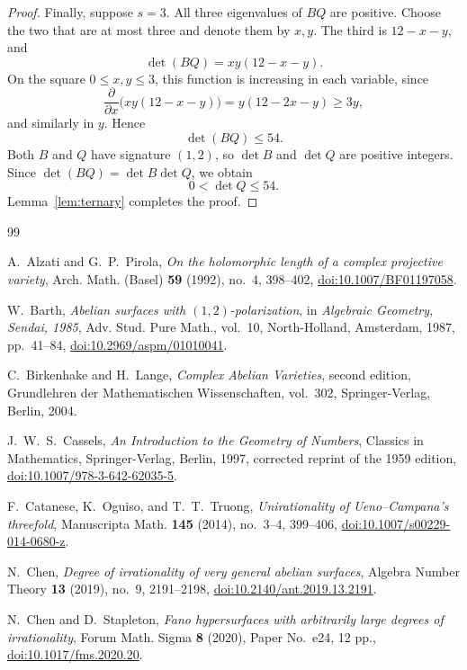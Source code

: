 \documentclass[12pt]{amsart}
\numberwithin{equation}{section}
\theoremstyle{definition}
\theoremstyle{remark}
\begin{document}
\begin{proof}
Finally, suppose $s=3$.  All three eigenvalues of $BQ$ are positive.
Choose the two that are at most three and denote them by $x,y$.  The
third is $12-x-y$, and
\[
                         \det(BQ)=xy(12-x-y).
\]
On the square $0\leq x,y\leq3$, this function is increasing in each
variable, since
\[
 \frac{\partial}{\partial x}\bigl(xy(12-x-y)\bigr)
    =y(12-2x-y)\geq3y,
\]
and similarly in $y$.  Hence
\[
                             \det(BQ)\leq54.
\]
Both $B$ and $Q$ have signature $(1,2)$, so $\det B$ and $\det Q$ are
positive integers.  Since $\det(BQ)=\det B\det Q$, we obtain
\[
                             0<\det Q\leq54.
\]
Lemma~\ref{lem:ternary} completes the proof.
\end{proof}

\begin{thebibliography}{99}

A.~Alzati and G.~P.~Pirola,
\emph{On the holomorphic length of a complex projective variety},
Arch. Math. (Basel) \textbf{59} (1992), no.~4, 398--402,
\href{https://doi.org/10.1007/BF01197058}
{doi:10.1007/BF01197058}.

W.~Barth,
\emph{Abelian surfaces with $(1,2)$-polarization},
in \emph{Algebraic Geometry, Sendai, 1985},
Adv. Stud. Pure Math., vol.~10, North-Holland, Amsterdam, 1987,
pp.~41--84,
\href{https://doi.org/10.2969/aspm/01010041}
{doi:10.2969/aspm/01010041}.

C.~Birkenhake and H.~Lange,
\emph{Complex Abelian Varieties},
second edition, Grundlehren der Mathematischen Wissenschaften, vol.~302,
Springer-Verlag, Berlin, 2004.

J.~W.~S.~Cassels,
\emph{An Introduction to the Geometry of Numbers},
Classics in Mathematics, Springer-Verlag, Berlin, 1997,
corrected reprint of the 1959 edition,
\href{https://doi.org/10.1007/978-3-642-62035-5}
{doi:10.1007/978-3-642-62035-5}.

F.~Catanese, K.~Oguiso, and T.~T.~Truong,
\emph{Unirationality of Ueno--Campana's threefold},
Manuscripta Math. \textbf{145} (2014), no.~3--4, 399--406,
\href{https://doi.org/10.1007/s00229-014-0680-z}
{doi:10.1007/s00229-014-0680-z}.

N.~Chen,
\emph{Degree of irrationality of very general abelian surfaces},
Algebra Number Theory \textbf{13} (2019), no.~9, 2191--2198,
\href{https://doi.org/10.2140/ant.2019.13.2191}
{doi:10.2140/ant.2019.13.2191}.

N.~Chen and D.~Stapleton,
\emph{Fano hypersurfaces with arbitrarily large degrees of
irrationality},
Forum Math. Sigma \textbf{8} (2020), Paper No.~e24, 12 pp.,
\href{https://doi.org/10.1017/fms.2020.20}
{doi:10.1017/fms.2020.20}.


\end{thebibliography}
\end{document}
